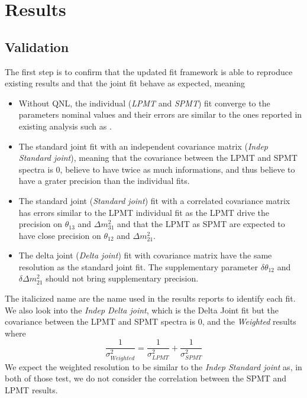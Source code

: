 \documentclass[../main.tex]{subfiles}
\begin{document}
\section{Results}
\label{sec:joint_fit:results}
%
%
%

\subsection{Validation}
\label{sec:joint_fit:validation}

The first step is to confirm that the updated fit framework is able to reproduce existing results and that the joint fit behave as expected, meaning
\begin{itemize}
  \item Without QNL, the individual (\textit{LPMT} and \textit{SPMT}) fit converge to the parameters nominal values and their errors are similar to the ones reported in existing analysis such as \cite{juno_collaboration_sub-percent_2022}.
  \item The standard joint fit with an independent covariance matrix (\textit{Indep Standard joint}), meaning that the covariance between the LPMT and SPMT spectra is 0, believe to have twice as much informations, and thus believe to have a grater precision than the individual fits.
  \item The standard joint (\textit{Standard joint}) fit with a correlated covariance matrix has errors similar to the LPMT individual fit as the LPMT drive the precision on $\theta_{13}$ and $\Delta m^2_{31}$ and that the LPMT as SPMT are expected to have close precision on $\theta_{12}$ and $\Delta m^2_{21}$.
  \item The delta joint (\textit{Delta joint}) fit with covariance matrix have the same resolution as the standard joint fit. The supplementary parameter $\delta \theta_{12}$ and $\delta \Delta m^2_{21}$ should not bring supplementary precision.
\end{itemize}

The italicized name are the name used in the results reports to identify each fit. We also look into the \textit{Indep Delta joint}, which is the Delta Joint fit but the covariance between the LPMT and SPMT spectra is 0, and the \textit{Weighted} results where
\begin{equation}
  \frac{1}{\sigma^2_{Weighted}} = \frac{1}{\sigma^2_{LPMT}} + \frac{1}{\sigma^2_{SPMT}}
\end{equation}
We expect the weighted resolution to be similar to the \textit{Indep Standard joint} as, in both of those test, we do not consider the correlation between the SPMT and LPMT results.
\end{document}
